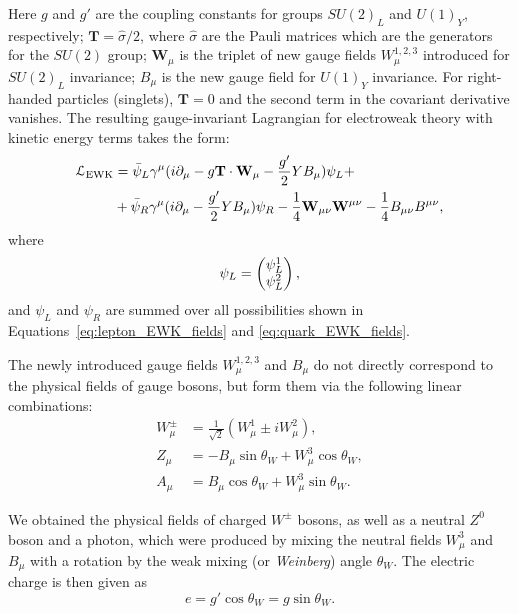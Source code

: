 Here $g$ and $g'$ are the coupling constants for groups $SU(2)_L$ and $U(1)_Y$, respectively; $\mathbf{T} =
\hat{\sigma}/2$, where $\hat{\sigma}$ are the Pauli matrices which are the generators for the $SU(2)$ group;
$\mathbf{W}_\mu$ is the triplet of new gauge fields $W^{1,2,3}_\mu$ introduced for $SU(2)_L$ invariance; $B_\mu$ is the
new gauge field for $U(1)_Y$ invariance. For right-handed particles (singlets), $\mathbf{T} = 0$ and the second term in
the covariant derivative vanishes. The resulting gauge-invariant Lagrangian for electroweak theory with kinetic energy
terms takes the form:
\begin{equation}
\label{eq:EWK_L}
\begin{split}
\mathcal{L}_\textrm{EWK} & = \bar{\psi}_L \gamma^\mu ( i\partial_\mu  - g \mathbf{T} \cdot \mathbf{W}_\mu - \frac{g'}{2} Y
B_\mu) \psi_L + \\ & + \bar{\psi}_R \gamma^\mu (i \partial_\mu - \frac{g'}{2} Y B_\mu) \psi_R -
\frac{1}{4}\mathbf{W}_{\mu\nu} \mathbf{W}^{\mu\nu} -\frac{1}{4}B_{\mu\nu} B^{\mu\nu},
\end{split}
\end{equation}
where
\begin{equation*}
\psi_L = \begin{pmatrix} \psi^1_L \\ \psi^2_L \end{pmatrix},
\end{equation*}
and $\psi_L$ and $\psi_R$ are summed over all possibilities shown in Equations~\ref{eq:lepton_EWK_fields} and
\ref{eq:quark_EWK_fields}.

The newly introduced gauge fields $W^{1,2,3}_\mu$ and $B_\mu$ do not directly correspond to the physical fields of
gauge bosons, but form them via the following linear combinations:
\begin{subequations}
\begin{align}
W^{\pm}_\mu & = \frac{1}{\sqrt{2}} (W^1_\mu \pm  i W^2_\mu), \label{eq:W_mu} \\
Z_\mu & = - B_\mu \sin{\theta_W} + W^3_\mu \cos{\theta_W}, \label{eq:Z_mu} \\
A_\mu & = B_\mu \cos{\theta_W} + W^3_\mu \sin{\theta_W}. \label{eq:A_mu}
\end{align}
\end{subequations}

We obtained the physical fields of charged $W^{\pm}$ bosons, as well as a neutral $Z^0$ boson and a photon, which were
produced by mixing the neutral fields $W^3_\mu$ and $B_\mu$ with a rotation by the weak mixing (or
\textit{Weinberg}) angle $\theta_W$. The electric charge is then given as
\begin{equation}
e = g' \cos{\theta_W} = g \sin{\theta_W}.
\end{equation}

